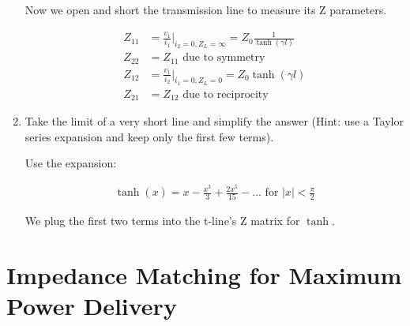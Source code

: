 \documentclass[11pt]{article}
\begin{document}
\begin{enumerate}
	Now we open and short the transmission line to measure its Z parameters.
	
	\begin{align*}
		Z_{11} &= \frac{v_1}{i_1} \bigg\rvert_{i_2 = 0, Z_L = \infty} = Z_0 \frac{1}{\tanh(\gamma l)} \\
		Z_{22} &= Z_{11} \text{ due to symmetry} \\
		Z_{12} &= \frac{v_1}{i_2} \bigg\rvert_{i_1 = 0, Z_L = 0} = Z_0 \tanh(\gamma l) \\
		Z_{21} &= Z_{12} \text{ due to reciprocity}
	\end{align*}
	
	\item Take the limit of a very short line and simplify the answer (Hint: use a Taylor series expansion and keep only the first few terms).
	
	Use the expansion:
	
	\begin{align*}
		\tanh(x) = x - \frac{x^3}{3} + \frac{2x^5}{15} - ... \text{ for } |x| < \frac{\pi}{2}
	\end{align*}
	
	We plug the first two terms into the t-line's Z matrix for $\tanh$.

\end{enumerate}

\section{Impedance Matching for Maximum Power Delivery}
\end{document}
